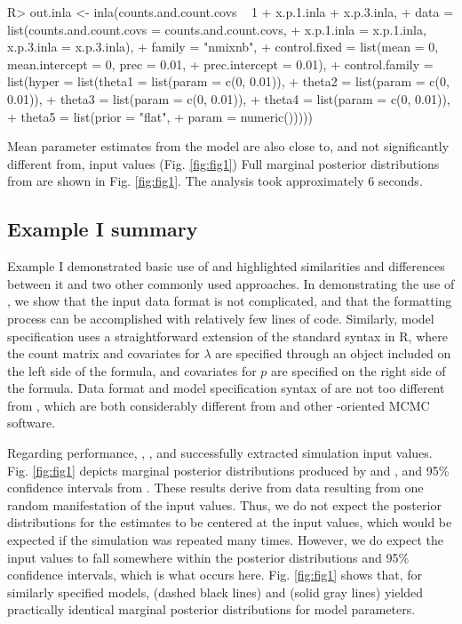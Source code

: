 \documentclass[article]{jss}
\begin{document}
\begin{Code}
R> out.inla <- inla(counts.and.count.covs ~ 1 + x.p.1.inla + x.p.3.inla,
+           data = list(counts.and.count.covs = counts.and.count.covs,
+                       x.p.1.inla = x.p.1.inla, x.p.3.inla = x.p.3.inla),
+           family = "nmixnb",
+           control.fixed = list(mean = 0, mean.intercept = 0, prec = 0.01,
+                                prec.intercept = 0.01),
+           control.family = list(hyper = list(theta1 = list(param = c(0, 0.01)),
+                                              theta2 = list(param = c(0, 0.01)),
+                                              theta3 = list(param = c(0, 0.01)),
+                                              theta4 = list(param = c(0, 0.01)),
+                                              theta5 = list(prior = "flat",
+                                                            param = numeric()))))
\end{Code}

Mean parameter estimates from the  model are also close to, and not significantly different from, input values (Fig. \ref{fig:fig1})  Full marginal posterior distributions from  are shown in Fig. \ref{fig:fig1}.  The analysis took approximately 6 seconds.

\subsection[Example I summary]{Example I summary}
Example I demonstrated basic use of  and highlighted similarities and differences between it and two other commonly used approaches.  In demonstrating the use of , we show that the input data format is not complicated, and that the formatting process can be accomplished with relatively few lines of code.  Similarly, model specification uses a straightforward extension of the standard syntax in R, where the count matrix and covariates for $\lambda$ are specified through an  object included on the left side of the formula, and covariates for $p$ are specified on the right side of the formula. Data format and model specification syntax of  are not too different from , which are both considerably different from  and other -oriented MCMC software.

Regarding performance, , , and  successfully extracted simulation input values.  Fig. \ref{fig:fig1} depicts marginal posterior distributions produced by  and , and 95\% confidence intervals from .   These results derive from data resulting from one random manifestation of the input values.  Thus, we do not expect the posterior distributions for the estimates to be centered at the input values, which would be expected if the simulation was repeated many times.  However, we do expect the input values to fall somewhere within the posterior distributions and 95\% confidence intervals, which is what occurs here.  Fig. \ref{fig:fig1} shows that, for similarly specified models,  (dashed black lines) and  (solid gray lines) yielded practically identical marginal posterior distributions for model parameters.
\end{document}
